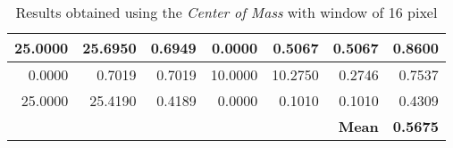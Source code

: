 \begin{table}[h!]
\begin{tabular}{|r|r|r|r|r|r|r|}
25.0000                              & 25.6950                               & 0.6949                               & 0.0000                              & 0.5067                                & 0.5067                               & 0.8600                                                     \\ \hline
0.0000                               & 0.7019                                & 0.7019                               & 10.0000                             & 10.2750                               & 0.2746                               & 0.7537                                                     \\ \hline
25.0000                              & 25.4190                               & 0.4189                               & 0.0000                              & 0.1010                                & 0.1010                               & 0.4309                                                     \\ \hline
\multicolumn{6}{|r|}{\textbf{Mean}}                                                                                                                                                                                                      & \textbf{0.5675}                                            \\ \hline
\end{tabular}
\caption{Results obtained using the \textit{Center of Mass} with window of 16 pixel}
\label{tab:c5-r1-real}
\end{table}